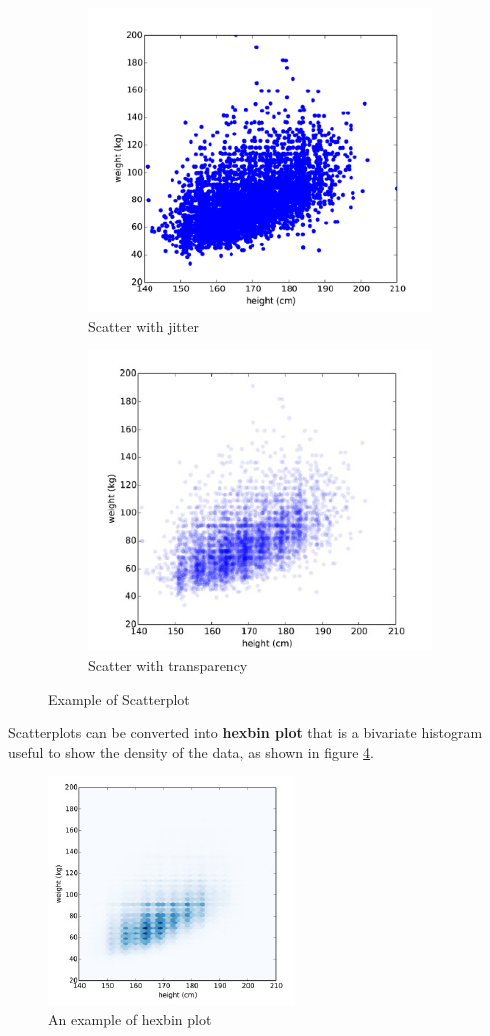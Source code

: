 \begin{figure}[H]
  \begin{subfigure}{.5\textwidth}
    \centering
    \includegraphics[width=.6\linewidth]{images/DataExplVis/Scatter1.png}
    \caption{Scatter with jitter}
    \label{fig:scat1}
  \end{subfigure}
  \begin{subfigure}{.5 \textwidth}
    \centering
    \includegraphics[width=.6\linewidth]{images/DataExplVis/Scatter2.png}
    \caption{Scatter with transparency}
    \label{fig:scat2}
  \end{subfigure}
  \caption{Example of Scatterplot}
\end{figure}

Scatterplots can be converted into \textbf{hexbin plot} that is a 
bivariate histogram useful to show the density of the data, as shown
in figure \ref{fig:hexbin}.
\begin{figure}[H]
  \centering
  \includegraphics[scale=0.60]{images/DataExplVis/hexbin.png}
  \caption{An example of hexbin plot}
  \label{fig:hexbin}
\end{figure}

